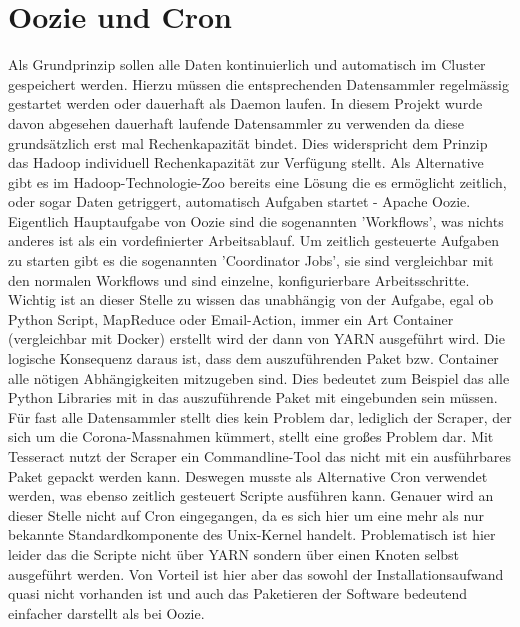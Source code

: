 \documentclass[12pt,oneside,a4paper,parskip]{scrbook}
\begin{document}
\section{Oozie und Cron}
Als Grundprinzip sollen alle Daten kontinuierlich und automatisch im Cluster gespeichert werden. Hierzu m\"ussen die entsprechenden Datensammler regelm\"assig gestartet werden oder dauerhaft als Daemon laufen. In diesem Projekt wurde davon abgesehen dauerhaft laufende Datensammler zu verwenden da diese grunds\"atzlich erst mal Rechenkapazit\"at bindet. Dies widerspricht dem Prinzip das Hadoop individuell Rechenkapazit\"at zur Verf\"ugung stellt.\newline
Als Alternative gibt es im Hadoop-Technologie-Zoo bereits eine L\"osung die es erm\"oglicht zeitlich, oder sogar Daten getriggert, automatisch Aufgaben startet - Apache Oozie. Eigentlich Hauptaufgabe von Oozie sind die sogenannten 'Workflows', was nichts anderes ist als ein vordefinierter Arbeitsablauf. Um zeitlich gesteuerte Aufgaben zu starten gibt es die sogenannten 'Coordinator Jobs', sie sind vergleichbar mit den normalen Workflows und sind einzelne, konfigurierbare Arbeitsschritte. Wichtig ist an dieser Stelle zu wissen das unabh\"angig von der Aufgabe, egal ob Python Script, MapReduce oder Email-Action, immer ein Art Container (vergleichbar mit Docker) erstellt wird der dann von YARN ausgef\"uhrt wird. \newline
Die logische Konsequenz daraus ist, dass dem auszuf\"uhrenden Paket bzw. Container alle n\"otigen Abh\"angigkeiten mitzugeben sind. Dies bedeutet zum Beispiel das alle Python Libraries mit in das auszuf\"uhrende Paket mit eingebunden sein m\"ussen. F\"ur fast alle Datensammler stellt dies kein Problem dar, lediglich der Scraper, der sich um die Corona-Massnahmen k\"ummert, stellt eine großes Problem dar. Mit Tesseract nutzt der Scraper ein Commandline-Tool das nicht mit ein ausf\"uhrbares Paket gepackt werden kann. \newline
Deswegen musste als Alternative Cron verwendet werden, was ebenso zeitlich gesteuert Scripte ausf\"uhren kann. Genauer wird an dieser Stelle nicht auf Cron eingegangen, da es sich hier um eine mehr als nur bekannte Standardkomponente des Unix-Kernel handelt. Problematisch ist hier leider das die Scripte nicht \"uber YARN sondern \"uber einen Knoten selbst ausgef\"uhrt werden. Von Vorteil ist hier aber das sowohl der Installationsaufwand quasi nicht vorhanden ist und auch das Paketieren der Software bedeutend einfacher darstellt als bei Oozie.
\end{document}

